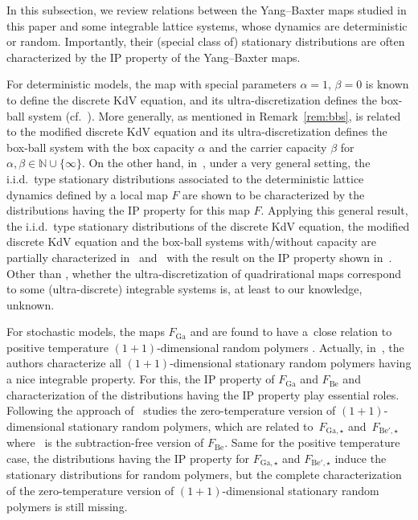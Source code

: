 \documentclass[pdftex]{sigma}
\numberwithin{equation}{section}
\def\N{{\mathbb{N}}}
\def\a{{\alpha}}
\def\b{{\beta}}
\begin{document}
In this subsection, we review relations between the Yang--Baxter maps studied in this paper and some integrable lattice systems, whose dynamics are deterministic or random. Importantly, their (special class of) stationary distributions are often characterized by the IP property of the Yang--Baxter maps.

For deterministic models, the map  with special parameters $\alpha=1$, $\beta=0$ is known to define the discrete KdV equation, and its ultra-discretization defines the box-ball system (cf.\ \cite{Inoue_2012,KNW, TS90,TH98}). More generally, as mentioned in Remark~\ref{rem:bbs},  is related to the modified discrete KdV equation and its ultra-discretization \smash{$H^{B,\a,\b}_{\mathrm{III},\star}$} defines the box-ball system with the box capacity $\a$ and the carrier capacity $\b$ for $\a,\b \in \N \cup \{\infty\}$. On the other hand, in~\cite{CSirf}, under a very general setting, the i.i.d.\ type stationary distributions associated to the deterministic lattice dynamics defined by a local map $F$ are shown to be characterized by the distributions having the IP property for this map $F$. Applying this general result, the i.i.d.\ type stationary distributions of the discrete KdV equation, the modified discrete KdV equation and the box-ball systems with/without capacity are partially characterized in~\cite{CS} and~\cite{CSirf} with the result on the IP property shown in~\cite{LW2}. Other than \smash{$H^{B,\a,\b}_{\mathrm{III},\star}$}, whether the ultra-discretization of quadrirational maps correspond to some (ultra-discrete) integrable systems is, at least to our knowledge, unknown.

For stochastic models, the maps $F_{\mathrm{Ga}}$ and  are found to have a~close relation to positive temperature $(1+1)$-dimensional random polymers \cite{CN}. Actually, in~\cite{CN}, the authors characterize all $(1+1)$-dimensional stationary random polymers having a nice integrable property. For this, the IP property of $F_{\mathrm{Ga}}$ and $F_{\mathrm{Be}}$ and characterization of the distributions having the IP property play essential roles. Following the approach of~\cite{CN,CSjsp} studies the zero-temperature version of $(1+1)$-dimensional stationary random polymers, which are related to~$F_{\mathrm{Ga},\star}$ and~$F_{{\mathrm{Be}}',\star}$ where~ is the subtraction-free version of $F_{\mathrm{Be}}$. Same for the positive temperature case, the distributions having the IP property for $F_{\mathrm{Ga},\star}$ and $F_{{\mathrm{Be}}',\star}$ induce the stationary distributions for random polymers, but the complete characterization of the zero-temperature version of $(1+1)$-dimensional stationary random polymers is still missing.
\end{document}

